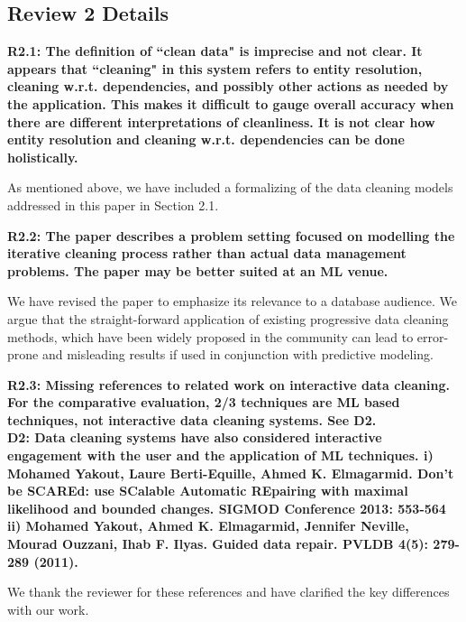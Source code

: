 \subsection*{Review 2 Details}

\noindent\textbf{R2.1: The definition of ``clean data" is imprecise and not clear. It appears that ``cleaning" in this system refers to entity resolution, cleaning w.r.t. dependencies, and possibly other actions as needed by the application. This makes it difficult to gauge overall accuracy when there are different interpretations of cleanliness. It is not clear how entity resolution and cleaning w.r.t. dependencies can be done holistically.}

As mentioned above, we have included a formalizing of the data cleaning models addressed in this paper in Section 2.1. 

\vspace{0.5em}

\noindent\textbf{R2.2: The paper describes a problem setting focused on modelling the iterative cleaning process rather than actual data management problems. The paper may be better suited at an ML venue.}

We have revised the paper to emphasize its relevance to a database audience. We argue that the straight-forward application of existing progressive data cleaning methods, which have been widely proposed in the community can lead to error-prone and misleading results if used in conjunction with predictive modeling. 

\vspace{0.5em}

\noindent\textbf{R2.3: Missing references to related work on interactive data cleaning. For the comparative evaluation, 2/3 techniques are ML based techniques, not interactive data cleaning systems. See D2.\\
D2: Data cleaning systems have also considered interactive engagement with the user and the application of ML techniques. 
i) Mohamed Yakout, Laure Berti-Equille, Ahmed K. Elmagarmid. Don't be SCAREd: use SCalable Automatic REpairing with maximal likelihood and bounded changes. SIGMOD Conference 2013: 553-564
ii) Mohamed Yakout, Ahmed K. Elmagarmid, Jennifer Neville, Mourad Ouzzani, Ihab F. Ilyas.
Guided data repair. PVLDB 4(5): 279-289 (2011).
}

We thank the reviewer for these references and have clarified the key differences with our work.

\vspace{0.5em}

